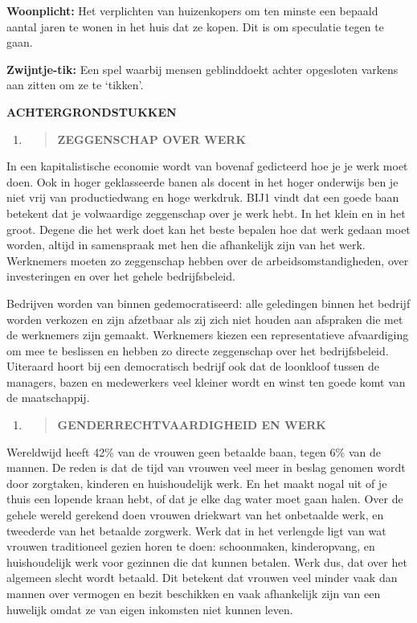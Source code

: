 \textbf{Woonplicht:} Het verplichten van huizenkopers om ten minste een
bepaald aantal jaren te wonen in het huis dat ze kopen. Dit is om
speculatie tegen te gaan.

\textbf{Zwijntje-tik:} Een spel waarbij mensen geblinddoekt achter
opgesloten varkens aan zitten om ze te `tikken'.

\textbf{ACHTERGRONDSTUKKEN}

\begin{enumerate}
\def\labelenumi{\arabic{enumi}.}
\item
  \begin{quote}
  \textbf{ZEGGENSCHAP OVER WERK}
  \end{quote}
\end{enumerate}

In een kapitalistische economie wordt van bovenaf gedicteerd hoe je je
werk moet doen. Ook in hoger geklasseerde banen als docent in het hoger
onderwijs ben je niet vrij van productiedwang en hoge werkdruk. BIJ1
vindt dat een goede baan betekent dat je volwaardige zeggenschap over je
werk hebt. In het klein en in het groot. Degene die het werk doet kan
het beste bepalen hoe dat werk gedaan moet worden, altijd in samenspraak
met hen die afhankelijk zijn van het werk. Werknemers moeten zo
zeggenschap hebben over de arbeidsomstandigheden, over investeringen en
over het gehele bedrijfsbeleid.

Bedrijven worden van binnen gedemocratiseerd: alle geledingen binnen het
bedrijf worden verkozen en zijn afzetbaar als zij zich niet houden aan
afspraken die met de werknemers zijn gemaakt. Werknemers kiezen een
representatieve afvaardiging om mee te beslissen en hebben zo directe
zeggenschap over het bedrijfsbeleid. Uiteraard hoort bij een
democratisch bedrijf ook dat de loonkloof tussen de managers, bazen en
medewerkers veel kleiner wordt en winst ten goede komt van de
maatschappij.

\begin{enumerate}
\def\labelenumi{\arabic{enumi}.}
\setcounter{enumi}{1}
\item
  \begin{quote}
  \textbf{GENDERRECHTVAARDIGHEID EN WERK\\
  }
  \end{quote}
\end{enumerate}

Wereldwijd heeft 42\% van de vrouwen geen betaalde baan, tegen 6\% van
de mannen. De reden is dat de tijd van vrouwen veel meer in beslag
genomen wordt door zorgtaken, kinderen en huishoudelijk werk. En het
maakt nogal uit of je thuis een lopende kraan hebt, of dat je elke dag
water moet gaan halen. Over de gehele wereld gerekend doen vrouwen
driekwart van het onbetaalde werk, en tweederde van het betaalde
zorgwerk. Werk dat in het verlengde ligt van wat vrouwen traditioneel
gezien horen te doen: schoonmaken, kinderopvang, en huishoudelijk werk
voor gezinnen die dat kunnen betalen. Werk dus, dat over het algemeen
slecht wordt betaald. Dit betekent dat vrouwen veel minder vaak dan
mannen over vermogen en bezit beschikken en vaak afhankelijk zijn van
een huwelijk omdat ze van eigen inkomsten niet kunnen leven.

